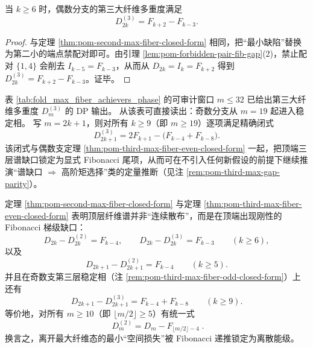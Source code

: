 \begin{theorem}[偶数支第三大纤维闭式]\label{thm:pom-third-max-fiber-even-closed-form}
当 \(k\ge 6\) 时，偶数分支的第三大纤维多重度满足
\[
D_{2k}^{(3)}=F_{k+2}-F_{k-3}.
\]
\end{theorem}
\begin{proof}
与定理 \ref{thm:pom-second-max-fiber-closed-form} 相同，把“最小缺陷”替换为第二小的端点禁配对即可。由引理 \ref{lem:pom-forbidden-pair-fib-gap}(2)，禁止配对 \(\{1,4\}\) 会削去 \(I_{k-5}=F_{k-3}\)，从而从 \(D_{2k}=I_k=F_{k+2}\) 得到 \(D_{2k}^{(3)}=F_{k+2}-F_{k-3}\)。证毕。
\end{proof}

\begin{remark}\label{rem:pom-third-max-fiber-odd-closed-form}
表 \ref{tab:fold_max_fiber_achievers_phase} 的可审计窗口 \(m\le 32\) 已给出第三大纤维多重度 \(D_m^{(3)}\) 的 DP 输出。
从该表可直接读出：奇数分支从 \(m=19\) 起进入稳定相。
写 \(m=2k+1\)，则对所有 \(k\ge 9\)（即 \(m\ge 19\)）逐项满足精确闭式
\[
\boxed{\;
D_{2k+1}^{(3)}=2F_{k+1}-\bigl(F_{k-4}+F_{k-8}\bigr).\;}
\]
该闭式与偶数支定理 \ref{thm:pom-third-max-fiber-even-closed-form} 一起，把顶端三层谱缺口锁定为显式 Fibonacci 尾项，从而可在不引入任何新假设的前提下继续推演“谱缺口 \(\Rightarrow\) 高阶矩选择”类的定量推断（见注 \ref{rem:pom-third-max-gap-parity}）。
\end{remark}

\begin{remark}\label{rem:pom-top-fiber-spectrum-ladder}
定理 \ref{thm:pom-second-max-fiber-closed-form} 与定理 \ref{thm:pom-third-max-fiber-even-closed-form} 表明顶层纤维谱并非“连续散布”，而是在顶端出现刚性的 Fibonacci 梯级缺口：
\[
D_{2k}-D_{2k}^{(2)}=F_{k-4},\qquad
D_{2k}-D_{2k}^{(3)}=F_{k-3}\qquad(k\ge 6),
\]
以及
\[
D_{2k+1}-D_{2k+1}^{(2)}=F_{k-4}\qquad(k\ge 5).
\]
并且在奇数支第三层稳定相（注 \ref{rem:pom-third-max-fiber-odd-closed-form}）上还有
\[
D_{2k+1}-D_{2k+1}^{(3)}=F_{k-4}+F_{k-8}\qquad(k\ge 9).
\]
等价地，对所有 \(m\ge 10\)（即 \(\lfloor m/2\rfloor\ge 5\)）有统一式
\[
\boxed{\;
D_m^{(2)}=D_m-F_{\lfloor m/2\rfloor-4}\; }.
\]
换言之，离开最大纤维态的最小“空间损失”被 Fibonacci 递推锁定为离散能级。
\end{remark}


